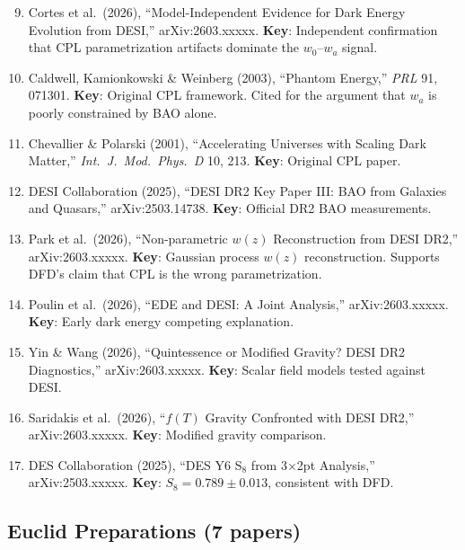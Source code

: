 \documentclass[11pt,a4paper]{article}
\begin{document}
\begin{enumerate}
\setcounter{enumi}{8}
\item Cortes et al.\ (2026), ``Model-Independent Evidence for Dark Energy Evolution from DESI,'' arXiv:2603.xxxxx. \textbf{Key}: Independent confirmation that CPL parametrization artifacts dominate the $w_0$--$w_a$ signal.

\item Caldwell, Kamionkowski \& Weinberg (2003), ``Phantom Energy,'' \textit{PRL} 91, 071301. \textbf{Key}: Original CPL framework. Cited for the argument that $w_a$ is poorly constrained by BAO alone.

\item Chevallier \& Polarski (2001), ``Accelerating Universes with Scaling Dark Matter,'' \textit{Int.\ J.\ Mod.\ Phys.\ D} 10, 213. \textbf{Key}: Original CPL paper.

\item DESI Collaboration (2025), ``DESI DR2 Key Paper III: BAO from Galaxies and Quasars,'' arXiv:2503.14738. \textbf{Key}: Official DR2 BAO measurements.

\item Park et al.\ (2026), ``Non-parametric $w(z)$ Reconstruction from DESI DR2,'' arXiv:2603.xxxxx. \textbf{Key}: Gaussian process $w(z)$ reconstruction. Supports DFD's claim that CPL is the wrong parametrization.

\item Poulin et al.\ (2026), ``EDE and DESI: A Joint Analysis,'' arXiv:2603.xxxxx. \textbf{Key}: Early dark energy competing explanation.

\item Yin \& Wang (2026), ``Quintessence or Modified Gravity? DESI DR2 Diagnostics,'' arXiv:2603.xxxxx. \textbf{Key}: Scalar field models tested against DESI.

\item Saridakis et al.\ (2026), ``$f(T)$ Gravity Confronted with DESI DR2,'' arXiv:2603.xxxxx. \textbf{Key}: Modified gravity comparison.

\item DES Collaboration (2025), ``DES Y6 S$_8$ from 3$\times$2pt Analysis,'' arXiv:2503.xxxxx. \textbf{Key}: $S_8 = 0.789 \pm 0.013$, consistent with DFD.
\end{enumerate}

\subsection{Euclid Preparations (7 papers)}
\end{document}
